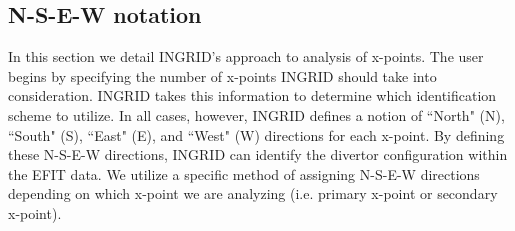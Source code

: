 \subsection{\label{sec:level2}N-S-E-W notation}
In this section we detail INGRID's approach to analysis of x-points. The user begins by specifying the number of x-points INGRID should take into consideration. INGRID takes this information to determine which identification scheme to utilize. In all cases, however, INGRID defines a notion of ``North" (N), ``South" (S), ``East" (E), and ``West" (W) directions for each x-point. By defining these N-S-E-W directions, INGRID can identify the divertor configuration within the EFIT data. We utilize a specific method of assigning N-S-E-W directions depending on which x-point we are analyzing (i.e. primary x-point or secondary x-point).